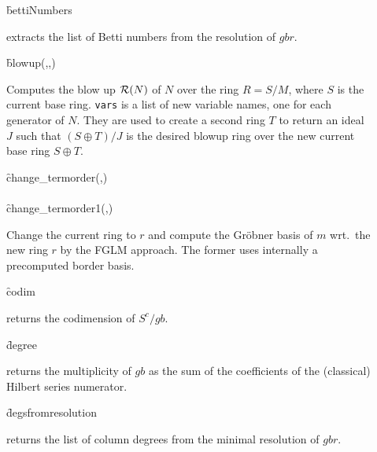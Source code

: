 \begin{description}
\item[]
  \begin{syntax}
    \f{bettiNumbers} 
  \end{syntax}
  \hypertarget{operator:BETTINUMBERS}{}
extracts the list of Betti numbers from the resolution of $gbr$.

\item[]
  \begin{syntax}
    \f{blowup}(,,)
  \end{syntax}
  \hypertarget{operator:BLOWUP}{}
Computes the blow up ${\cal R}(N)$ of $N$ over the ring $R=S/M$,
where $S$ is the current base ring. \texttt{vars} is a list of new
variable names, one for each generator of $N$. They are used to create
a second ring $T$ to return an ideal $J$ such that $(S\oplus T)/J$ is
the desired blowup ring over the new current base ring $S\oplus T$.

\item[]
  \begin{syntaxtable}
    \f{change\_termorder}(,)\\
    \\
    \f{change\_termorder1}(,)
  \end{syntaxtable}
  \hypertarget{operator:CHANGE_TERMORDER}{}
  \hypertarget{operator:CHANGE_TERMORDER1}{}
Change the current ring to $r$ and compute the Gr\"obner basis of $m$
wrt.\ the new ring $r$ by the FGLM approach. The former uses
internally a precomputed border basis.

\item[]
  \begin{syntax}
    \f{codim} 
  \end{syntax}
  \hypertarget{operator:CODIM}{}
returns the codimension of $S^c/gb$.

\item[]
  \begin{syntax}
    \f{degree} 
  \end{syntax}
  \hypertarget{operator:DEGREE}{}
returns the multiplicity of $gb$ as the sum of the coefficients
of the (classical) Hilbert series numerator.

\item[]
  \begin{syntax}
    \f{degsfromresolution} 
  \end{syntax}
  \hypertarget{operator:DEGSFROMRESOLUTION}{}
returns the list of column degrees from the minimal resolution
of $gbr$.


\end{description}
